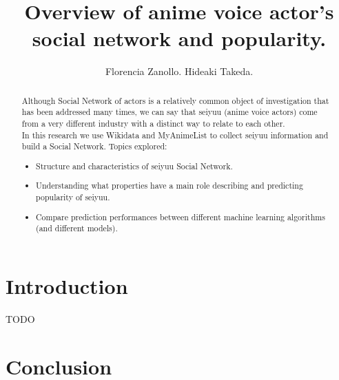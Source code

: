 \documentclass[a4paper]{report}
\begin{document}
	\title{Overview of anime voice actor's social network and popularity.}
	\author{Florencia Zanollo. Hideaki Takeda.}
	\maketitle
	\tableofcontents

\begin{abstract}
	Although Social Network of actors is a relatively common object of investigation that has been addressed many times, we can say that seiyuu (anime voice actors) come from a very different industry with a distinct way to relate to each other. \\
	In this research we use Wikidata and MyAnimeList to collect seiyuu information and build a Social Network. Topics explored:
	\begin{itemize}
	\item Structure and characteristics of seiyuu Social Network.
	\item Understanding what properties have a main role describing and predicting popularity of seiyuu.
	\item Compare prediction performances between different machine learning algorithms (and different models).
	\end{itemize}
\end{abstract}

\chapter*{Introduction}
	TODO





\chapter*{Conclusion}
	

\begin{thebibliography}{5}

\end{thebibliography}
\end{document}
